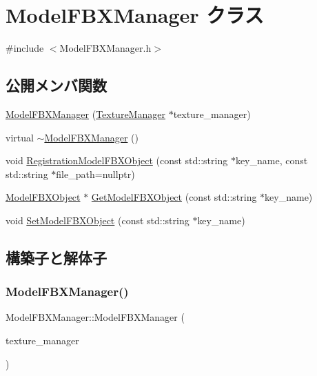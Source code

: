 \hypertarget{class_model_f_b_x_manager}{}\section{Model\+F\+B\+X\+Manager クラス}
\label{class_model_f_b_x_manager}


{\ttfamily \#include $<$Model\+F\+B\+X\+Manager.\+h$>$}

\subsection*{公開メンバ関数}
\begin{DoxyCompactItemize}
\item 
\mbox{\hyperlink{class_model_f_b_x_manager_a56089e9327a1739e3b88dada724bd898}{Model\+F\+B\+X\+Manager}} (\mbox{\hyperlink{class_texture_manager}{Texture\+Manager}} $\ast$texture\+\_\+manager)
\item 
virtual \mbox{\hyperlink{class_model_f_b_x_manager_a6714c69d45e3aad2d0d04b0d1a69d2dc}{$\sim$\+Model\+F\+B\+X\+Manager}} ()
\item 
void \mbox{\hyperlink{class_model_f_b_x_manager_a9a010cad6b7ddf07169daec28807b143}{Registration\+Model\+F\+B\+X\+Object}} (const std\+::string $\ast$key\+\_\+name, const std\+::string $\ast$file\+\_\+path=nullptr)
\item 
\mbox{\hyperlink{class_model_f_b_x_object}{Model\+F\+B\+X\+Object}} $\ast$ \mbox{\hyperlink{class_model_f_b_x_manager_abff9802a7edef85fd3b5de53d1d0b177}{Get\+Model\+F\+B\+X\+Object}} (const std\+::string $\ast$key\+\_\+name)
\item 
void \mbox{\hyperlink{class_model_f_b_x_manager_a1b25dfc755e529dc5f61913697ef99d1}{Set\+Model\+F\+B\+X\+Object}} (const std\+::string $\ast$key\+\_\+name)
\end{DoxyCompactItemize}


\subsection{構築子と解体子}
\mbox{\label{class_model_f_b_x_manager_a56089e9327a1739e3b88dada724bd898}} 
\subsubsection{\texorpdfstring{Model\+F\+B\+X\+Manager()}{ModelFBXManager()}}
{\footnotesize\ttfamily Model\+F\+B\+X\+Manager\+::\+Model\+F\+B\+X\+Manager (\begin{DoxyParamCaption}\item[{\mbox{\hyperlink{class_texture_manager}{Texture\+Manager}} $\ast$}]{texture\+\_\+manager }\end{DoxyParamCaption})}


